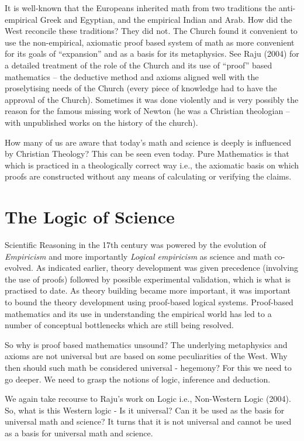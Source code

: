It is well-known that the Europeans inherited math from two traditions the anti-empirical Greek and Egyptian, and the empirical Indian and Arab. How did the West reconcile these traditions? They did not. The Church found it convenient to use the non-empirical, axiomatic proof based system of math as more convenient for its goals of “expansion” and as a basis for its metaphysics. See Raju (2004) for a detailed treatment of the role of the Church and its use of “proof” based mathematics – the deductive method and axioms aligned well with the proselytising needs of the Church (every piece of knowledge had to have the approval of the Church). Sometimes it was done violently and is very possibly the reason for the famous missing work of Newton (he was a Christian theologian – with unpublished works on the history of the church).

How many of us are aware that today’s math and science is deeply is influenced by Christian Theology? This can be seen even today. Pure Mathematics is that which is practiced in a theologically correct way i.e., the axiomatic basis on which proofs are constructed without any means of calculating or verifying the claims.


\section*{The Logic of Science}

Scientific Reasoning in the 17th century was powered by the evolution of \textit{Empiricism} and more importantly \textit{Logical empiricism} as science and math co-evolved. As indicated earlier, theory development was given precedence (involving the use of proofs) followed by possible experimental validation, which is what is practised to date. As theory building became more important, it was important to bound the theory development using proof-based logical systems. Proof-based mathematics and its use in understanding the empirical world has led to a number of conceptual bottlenecks which are still being resolved.

So why is proof based mathematics unsound? The underlying metaphysics and axioms are not universal but are based on some peculiarities of the West. Why then should such math be considered universal - hegemony? For this we need to go deeper. We need to grasp the notions of logic, inference and deduction.

We again take recourse to Raju’s work on Logic i.e., Non-Western Logic (2004). So, what is this Western logic - Is it universal? Can it be used as the basis for universal math and science? It turns that it is not universal and cannot be used as a basis for universal math and science.

